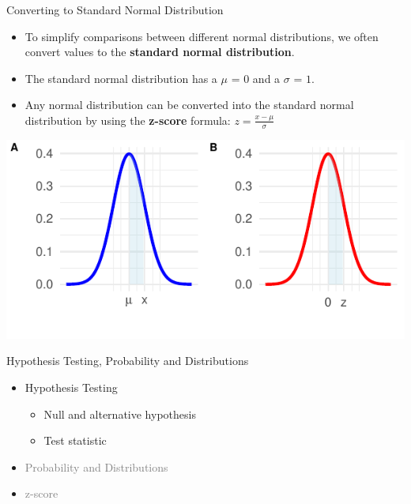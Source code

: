\documentclass[
  ignorenonframetext,
]{beamer}
\providecommand{\tightlist}{%
  \setlength{\itemsep}{0pt}\setlength{\parskip}{0pt}}
\begin{document}
\begin{frame}{Converting to Standard Normal Distribution}
\label{converting-to-standard-normal-distribution}
\begin{itemize}
\tightlist
\item
  To simplify comparisons between different normal distributions, we
  often convert values to the \textbf{standard normal distribution}.
\end{itemize}

\begin{itemize}
\tightlist
\item
  The standard normal distribution has a \(\mu\) = \(0\) and a
  \(\sigma\) = \(1\).
\end{itemize}

\begin{itemize}
\tightlist
\item
  Any normal distribution can be converted into the standard normal
  distribution by using the \textbf{z-score} formula:
  \(z = \frac{x - \mu}{\sigma}\)
\end{itemize}

\includegraphics{M5-Hypothesis-Testing,-Probability-and-Distribution_files/figure-beamer/unnamed-chunk-2-1.pdf}
\end{frame}

\begin{frame}{Hypothesis Testing, Probability and Distributions}
\label{hypothesis-testing-probability-and-distributions}
\begin{itemize}
\tightlist
\item
  Hypothesis Testing

  \begin{itemize}
  \tightlist
  \item
    Null and alternative hypothesis
  \item
    Test statistic
  \end{itemize}
\end{itemize}

\begin{itemize}
\tightlist
\item
  \textcolor{gray}{Probability and Distributions}
\end{itemize}

\begin{itemize}
\tightlist
\item
  \textcolor{gray}{z-score}
\end{itemize}
\end{frame}
\end{document}
